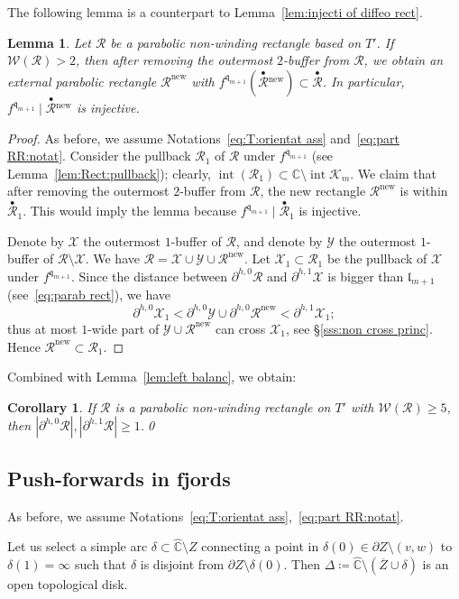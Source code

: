 \documentclass{amsart}
\newcommand{\1}{{\mathbb 1 }}
\newcommand{\upbullet}[1]{\overset{\bullet}{ #1}{}}
\newcommand{\Width}{{\mathcal W}}
\newcommand\YY{\mathcal{Y}}
\newcommand\RR{\mathcal{R}}
\newcommand\XX{\mathcal{X}}
\newcommand\intr{\operatorname{int}}
\newcommand{\qq}{\mathfrak{q}}
\newcommand{\length}{{\mathfrak l}}
\newcommand\new{{\operatorname{new}}}
\newcommand{\wC}{\widehat{\mathbb{C}}}
\newcommand{\C}{\mathbb{C}}
\newtheorem{cor}[thm]{Corollary}
\newtheorem{lem}[thm]{Lemma}
\theoremstyle{remark}
\numberwithin{equation}{section}
\theoremstyle{definition}
\newcommand{\filled}{{\mathcal {K} }}
\begin{document}
The following lemma is a counterpart to Lemma~\ref{lem:injecti of diffeo rect}.
\begin{lem}
\label{lem:zero wind are diffeo} Let $\RR$ be a parabolic  non-winding rectangle based on $T'$. If $\Width(\RR)>2$, then after removing the outermost $2$-buffer from $\RR$, we obtain an external parabolic rectangle $\RR^\new$ with $ f^{\qq_{m+1}}\left(\upbullet{\RR}^\new\right)\subset \upbullet\RR$. In particular, $f^{\qq_{m+1}}\mid \upbullet\RR^\new$ is injective.
\end{lem}
\begin{proof}
As before, we assume Notations~\eqref{eq:T:orientat ass} and~\eqref{eq:part RR:notat}.  Consider the pullback $\RR_1$ of $\RR$ under $f^{\qq_{m+1}}$ (see Lemma~\ref{lem:Rect:pullback}); clearly, $\intr(\RR_1)\subset \C\setminus \intr\filled_m$. We claim that after removing the outermost $2$-buffer from $\RR$, the new rectangle $\RR^\new$ is within $\upbullet \RR_1$. This would imply the lemma because $f^{\qq_{m+1}}\mid \upbullet\RR_1$ is injective.   



Denote by $\XX$ the outermost $1$-buffer of $\RR$, and denote by $\YY$ the outermost $1$-buffer of $\RR\setminus \XX$. We have $\RR=\XX\cup \YY\cup \RR^\new$. Let $\XX_1\subset \RR_1$ be the pullback of $\XX$ under $f^{\qq_{m+1}}$. 
Since the distance between $\partial ^{h,0} \RR$ and $\partial ^{h,1}\XX$ is bigger than $\length_{m+1}$ (see~\eqref{eq:parab rect}), we have \[\partial ^{h,0} \XX_1<\partial^{h,0}\YY\cup \partial^{h,0}\RR^\new < \partial^{h,1} \XX_1;\]
thus at most $1$-wide part of $\YY\cup \RR^\new$ can cross $\XX_1$, see \S\ref{sss:non cross princ}. Hence $\RR^\new\subset \RR_1$.
\end{proof}

Combined with Lemma~\ref{lem:left balanc}, we obtain:

\begin{cor}
If $\RR$ is a parabolic non-winding rectangle on $T'$ with $\Width(\RR)\ge 5$, then $|\partial ^{h,0}\RR|,|\partial ^{h,1}\RR|\ge 1$.\qed
\end{cor}

\subsection{Push-forwards in fjords}
\label{ss:push forw curves} As before, we assume Notations~\eqref{eq:T:orientat ass},~\eqref{eq:part RR:notat}.

Let us select a simple arc $\delta\subset \wC\setminus  Z$ connecting a point in $\delta(0)\in \partial Z\setminus (v,w)$ to $\delta(1)=\infty$ such that $\delta$ is disjoint from $\partial Z\setminus \delta(0).$ Then $\Delta\coloneqq \wC\setminus (\overline Z\cup \delta)$ is an open topological disk. 
\end{document}
